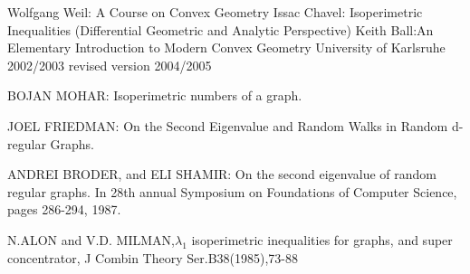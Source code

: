 \documentclass[oneside]{book}
\begin{document}
	
	\begin{thebibliography}{300}
		 \label{bib:1} 
		Wolfgang Weil: A Course
		on
		Convex Geometry
		 \label{bib:2}
		Issac Chavel: Isoperimetric Inequalities (Differential Geometric and Analytic Perspective)
		     \label{bib:3}
		Keith Ball:An Elementary Introduction to Modern Convex Geometry
		University of Karlsruhe
		2002/2003
		revised version 2004/2005
		
		    \label{bib:4}
		BOJAN MOHAR: Isoperimetric numbers of a graph.
		
		
		
		 \label{bib:5}
		JOEL FRIEDMAN: On the Second Eigenvalue and Random Walks in Random d-regular Graphs.
		    \label{bib:6}
		
		ANDREI BRODER, and ELI SHAMIR: On the second eigenvalue of random regular graphs. In 28th annual Symposium on Foundations of Computer Science, pages 286-294, 1987. 
		
		      \label{bib:7}
		N.ALON and V.D. MILMAN,$\lambda_{1}$ isoperimetric inequalities for graphs, and super concentrator, J Combin Theory Ser.B38(1985),73-88  
	\end{thebibliography}  
	
	
	
	
	
	
	
	
	
	
	
	
	
	
	
	
	
	
	
	
	
	
	
	
	
	
	
	
	
	
	
	
	
	
	
	
	
	
	
	
	
	
	
	
	
	
	
	
	
	
	
	
	
	
	
	
	
	
	
	
	
	
	
	
	
	
	
	
	
	
	
	
	
	
	
	
	
	
	
	
	
	
\end{document}
